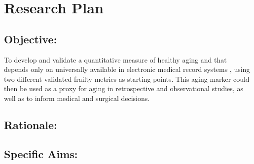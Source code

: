 \section{Research Plan }\label{research-plan}


\subsection{Objective:}\label{objective}
  
To develop and validate a quantitative measure of healthy aging and that depends only on universally available in electronic medical record systems ,
using two different validated frailty metrics as starting points. This
aging marker could then be used as a proxy for aging in retrospective
and observational studies, as well as to inform medical and surgical
decisions.


\subsection{Rationale:}\label{rationale}

\subsection{Specific Aims:}\label{specific-aims}
